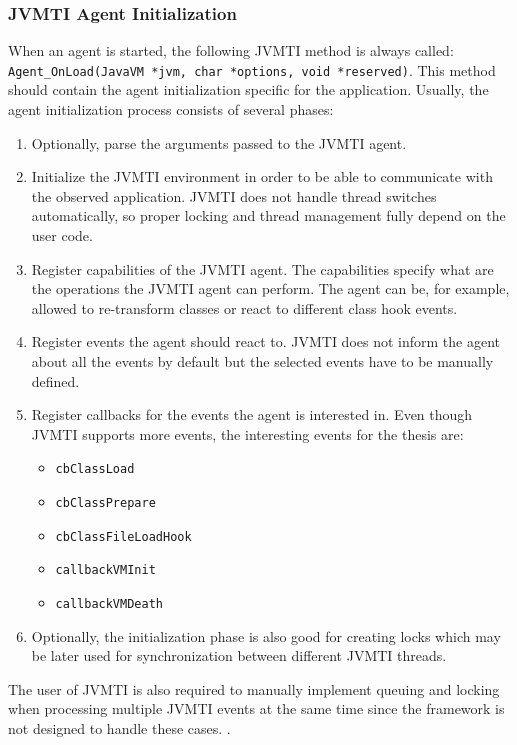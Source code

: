\subsubsection{JVMTI Agent Initialization}
\label{subsec:jvmti_init}
When an agent is started, the following JVMTI method is always called: \linebreak \texttt{Agent\_OnLoad(JavaVM *jvm, char *options, void *reserved)}.  \linebreak This method should contain the agent initialization specific for the application. Usually, the agent initialization process consists of several phases:
\begin{enumerate}
	\item Optionally, parse the arguments passed to the JVMTI agent.
	\item Initialize the JVMTI environment in order to be able to communicate with the observed application. JVMTI does not handle thread switches automatically, so proper locking and thread management fully depend on the user code.
	\item Register capabilities of the JVMTI agent. The capabilities specify what are the operations the JVMTI agent can perform. The agent can be, for example, allowed to re-transform classes or react to different class hook events.
	\item Register events the agent should react to. JVMTI does not inform the agent about all the events by default but the selected events have to be manually defined.
	\item Register callbacks for the events the agent is interested in. Even though JVMTI supports more events, the interesting events for the thesis are: 
		\begin{itemize}
			\item \texttt{cbClassLoad}
			\item \texttt{cbClassPrepare}
			\item \texttt{cbClassFileLoadHook}
			\item \texttt{callbackVMInit}
			\item \texttt{callbackVMDeath}
		\end{itemize}
	\item Optionally, the initialization phase is also good for creating locks which may be later used for synchronization between different JVMTI threads.
\end{enumerate}

The user of JVMTI is also required to manually implement queuing and locking when processing multiple JVMTI events at the same time since the framework is not designed to handle these cases. \cite{JVMTI_Callbacks}.
